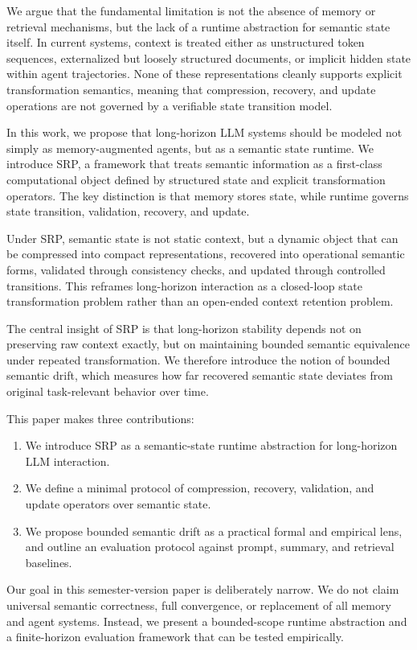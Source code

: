 \documentclass{article}
\begin{document}
We argue that the fundamental limitation is not the absence of memory or retrieval mechanisms, but the lack of a runtime abstraction for semantic state itself. In current systems, context is treated either as unstructured token sequences, externalized but loosely structured documents, or implicit hidden state within agent trajectories. None of these representations cleanly supports explicit transformation semantics, meaning that compression, recovery, and update operations are not governed by a verifiable state transition model.

In this work, we propose that long-horizon LLM systems should be modeled not simply as memory-augmented agents, but as a semantic state runtime. We introduce SRP, a framework that treats semantic information as a first-class computational object defined by structured state and explicit transformation operators. The key distinction is that memory stores state, while runtime governs state transition, validation, recovery, and update.

Under SRP, semantic state is not static context, but a dynamic object that can be compressed into compact representations, recovered into operational semantic forms, validated through consistency checks, and updated through controlled transitions. This reframes long-horizon interaction as a closed-loop state transformation problem rather than an open-ended context retention problem.

The central insight of SRP is that long-horizon stability depends not on preserving raw context exactly, but on maintaining bounded semantic equivalence under repeated transformation. We therefore introduce the notion of bounded semantic drift, which measures how far recovered semantic state deviates from original task-relevant behavior over time.

This paper makes three contributions:
\begin{enumerate}[leftmargin=*]
  \item We introduce SRP as a semantic-state runtime abstraction for long-horizon LLM interaction.
  \item We define a minimal protocol of compression, recovery, validation, and update operators over semantic state.
  \item We propose bounded semantic drift as a practical formal and empirical lens, and outline an evaluation protocol against prompt, summary, and retrieval baselines.
\end{enumerate}

Our goal in this semester-version paper is deliberately narrow. We do not claim universal semantic correctness, full convergence, or replacement of all memory and agent systems. Instead, we present a bounded-scope runtime abstraction and a finite-horizon evaluation framework that can be tested empirically.
\end{document}
